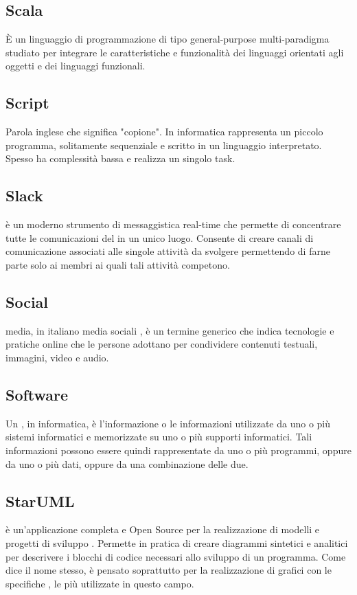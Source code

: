 \subsection*{Scala}
È un linguaggio di programmazione di tipo general-purpose multi-paradigma studiato per integrare le caratteristiche e funzionalità dei linguaggi orientati agli oggetti e dei linguaggi funzionali.

\subsection*{Script}
Parola inglese che significa "copione". In informatica rappresenta un piccolo
programma, solitamente sequenziale e scritto in un linguaggio interpretato.
Spesso ha complessità bassa e realizza un singolo task.

\subsection*{Slack}
 è un moderno strumento di messaggistica real-time che permette di concentrare tutte le comunicazioni del  in un unico luogo.
Consente di creare canali di comunicazione associati alle singole attività da svolgere permettendo di farne parte solo ai membri ai quali tali attività competono.

\subsection*{Social}
 media, in italiano media sociali , è un termine generico che indica tecnologie e pratiche online che le persone adottano per condividere contenuti testuali, immagini, video e audio.

\subsection*{Software}
Un , in informatica, è l'informazione o le informazioni utilizzate da uno o più
sistemi informatici e memorizzate su uno o più supporti informatici. Tali informazioni possono
essere quindi rappresentate da uno o più programmi, oppure da uno o più dati, oppure
da una combinazione delle due.

\subsection*{StarUML}
 è un'applicazione completa e Open Source per la realizzazione di modelli e progetti di sviluppo . Permette in pratica di creare diagrammi sintetici e analitici per descrivere i blocchi di codice necessari allo sviluppo di un programma. Come dice il nome stesso,  è pensato soprattutto per la realizzazione di grafici con le specifiche , le più utilizzate in questo campo.

